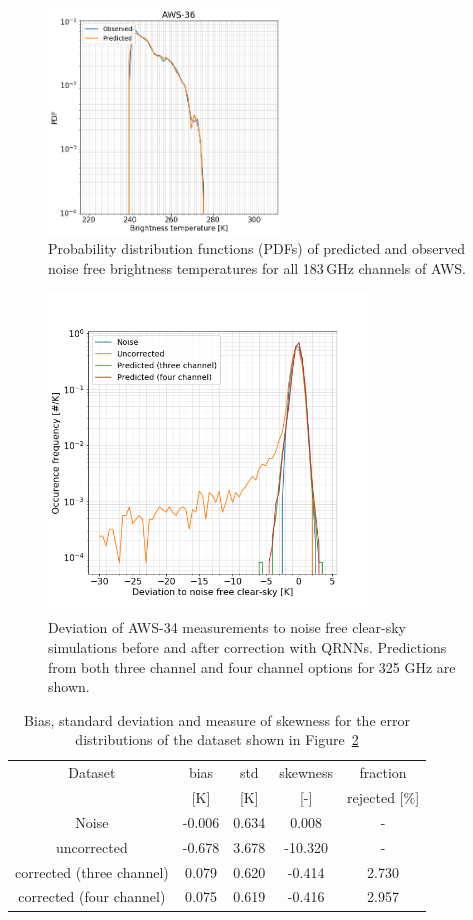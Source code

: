 \documentclass[12pt]{article}
\begin{document}
\begin{figure}[!tb]
	\includegraphics[height=60mm]{distribution_predicted_C36}
	\caption{ Probability distribution functions (PDFs) of predicted and observed noise free brightness temperatures for all 183\,GHz channels of AWS.  }
	\label{fig:pdf:qrnn}
\end{figure}


\begin{figure}[!tb]
	\centering
	\includegraphics[height=85mm]{Channel_C34.png}
	\caption{Deviation of AWS-34 measurements to noise free clear-sky
		simulations before and after correction with QRNNs. Predictions from both three channel and four channel options for 325 GHz are shown. }
	\label{fig:qrnn_C34:deviations}
\end{figure}

\begin{table}[!tb]
	\centering
	\begin{tabular}[b]{c|c|c|c|c}
	Dataset  		  &   bias &   std &   skewness & fraction  \\
	&   [K]  &   [K] & [-] & rejected [\%]\\
		\hline
Noise                     & -0.006 & 0.634 &              0.008 &      - \\
uncorrected               & -0.678 & 3.678 &            -10.320 &     - \\
corrected (three channel) &  0.079 & 0.620 &             -0.414 &      2.730 \\
corrected (four channel)  &  0.075 & 0.619 &             -0.416 &      2.957 \\
		\hline
	\end{tabular}
	\caption{ Bias, standard deviation and measure of skewness for the error distributions of the dataset shown in Figure~\ref{fig:qrnn_C34:deviations}}
	\label{tab:qrnn:C34}
\end{table}
\end{document}
